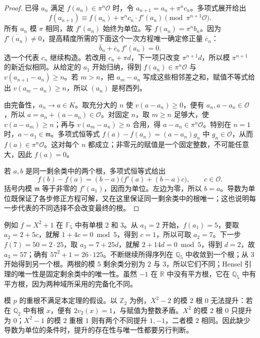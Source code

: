 \begin{proof}
	已得 \(a_n\) 满足 \(f(a_n)\in\pi^n\mathcal O\) 时，令 \(a_{n+1}=a_n+\pi^nc_n\)。多项式展开给出
	\[
		f(a_{n+1})\equiv f(a_n)+\pi^nc_n\cdot f'(a_n)\pmod{\pi^{n+1}\mathcal O}.
	\]
	所有 \(a_n\) 模 \(\pi\) 相同，故 \(f'(a_n)\) 始终为单位。写 \(f(a_n)=\pi^nb_n\)。因为 \(\overline{f'(a_n)}\neq0\)，提高精度所需的下面这个一次方程唯一确定修正量 \(\overline c_n\)：
	\[
		\overline b_n+\overline c_n\,\overline{f'(a_n)}=0.
	\]
	选一个代表 \(c_n\) 继续构造。若改用 \(c_n+\pi d\)，下一项只改变 \(\pi^{n+1}d\)，所以模 \(\pi^{n+1}\) 的新近似相同。从给定的 \(a_1\) 开始归纳，得到 \(f(a_n)\in\pi^n\mathcal O\) 与 \(v(a_{n+1}-a_n)\geq n\)。若 \(m>n\)，把 \(a_m-a_n\) 写成这些相邻差之和，赋值不等式给出 \(v(a_m-a_n)\geq n\)，所以 \((a_n)\) 是柯西列。

	由完备性，\(a_n\rightarrow a\in K\)。取充分大的 \(n\) 使 \(v(a-a_n)\geq0\)，便有 \(a_n,a-a_n\in\mathcal O\)，所以 \(a=a_n+(a-a_n)\in\mathcal O\)。对固定 \(n\)，取 \(m\geq n\) 足够大，使 \(v(a-a_m)\geq n\)；再与 \(v(a_m-a_n)\geq n\) 合用，得 \(a-a_n\in\pi^n\mathcal O\)。特别在 \(n=1\) 时，\(a-a_1\in\mathfrak m\)。多项式恒等式 \(f(a)-f(a_n)=(a-a_n)g_n\) 中 \(g_n\in\mathcal O\)，从而 \(f(a)\in\pi^n\mathcal O\)。这对每个 \(n\) 都成立；非零元的赋值是一个固定整数，不可能任意大，因此 \(f(a)=0\)。

	若 \(a,b\) 是同一剩余类中的两个根，多项式恒等式给出
	\[
		f(b)-f(a)=(b-a)\bigl(f'(a)+(b-a)c\bigr),\qquad c\in\mathcal O.
	\]
	括号内模 \(\mathfrak m\) 等于非零的 \(f'(a_1)\)，因而为单位。左边为零，所以 \(b=a\)。导数为单位既保证了各步修正方程可解，又在这里保证同一剩余类中的根唯一；这也说明每一步代表的不同选择不会改变最终的根。
\end{proof}

例如 \(f=X^2+1\) 在 \(\mathbb F_5\) 中有单根 \(2\) 和 \(3\)。从 \(a_1=2\) 开始，\(f(a_1)=5\)，要取 \(a_2=2+5c\)，就解 \(1+4c=0\bmod5\)，得到 \(c=1\)，所以可取 \(a_2=7\)。下一步 \(f(7)=50=2\cdot25\)，取 \(a_3=7+25d\)，就解 \(2+14d=0\bmod5\)，得到 \(d=2\)，故 \(a_3=57\)；确有 \(57^2+1=26\cdot125\)。不断继续所得序列在 \(\mathbb Q_5\) 中收敛到一个根；从 \(3\) 开始得到另一个根。两根的模 \(5\) 剩余类分别为 \(2\) 与 \(3\)，所以它们不同；Hensel 引理的唯一性是固定剩余类中的唯一性。虽然 \(-1\) 在 \(\mathbb R\) 中没有平方根，它在 \(\mathbb Q_5\) 中有平方根，因为两种域所采用的完备化不同。

\ProseParagraphBreak
模 \(p\) 的重根不满足本定理的假设。以 \(\mathbb Z_2\) 为例，\(X^2-2\) 的模 \(2\) 根 \(0\) 无法提升：若在 \(\mathbb Q_2\) 中有根 \(x\)，便有 \(2v_2(x)=1\)，与赋值为整数矛盾。\(X^2\) 的模 \(2\) 根 \(0\) 只提升为 \(0\)；\(X^2-1\) 的模 \(2\) 重根 \(1\) 则有两个不同提升 \(1,-1\)，二者模 \(2\) 相同。因此缺少导数为单位的条件时，提升的存在性与唯一性都要另行判断。

